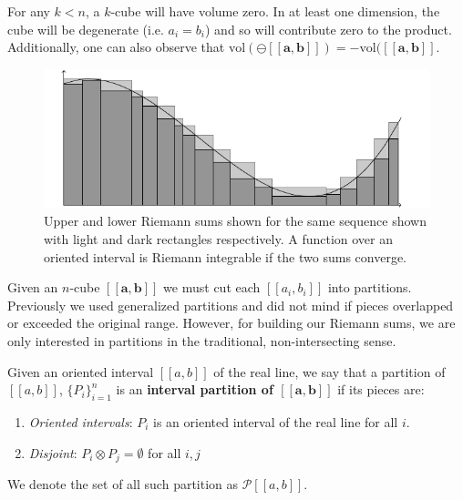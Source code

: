 For any $k<n$, a $k$-cube will have volume zero.
In at least one dimension, the cube will be degenerate (i.e. $a_i = b_i$) and so will contribute zero to the product.
Additionally, one can also observe that $\text{vol}( \ominus [\![\boldsymbol{a}, \boldsymbol{b} ]\!]) = - \text{vol}( [\![ \boldsymbol{a}, \boldsymbol{b} ]\!]$.


\begin{figure}[ht]
\caption[Riemann Integral]{Upper and lower Riemann sums shown for the same sequence shown with light and dark rectangles respectively. A function over an oriented interval is Riemann integrable if the two sums converge.}
\centering
\includegraphics[scale=0.6]{diagrams/riemann}
\end{figure}

Given an $n$-cube $[\![\boldsymbol{a}, \boldsymbol{b}]\!]$ we must cut each $[\![a_i, b_i]\!]$ into partitions.
Previously we used generalized partitions and did not mind if pieces overlapped or exceeded the original range.
However, for building our Riemann sums, we are only interested in partitions in the traditional, non-intersecting sense.

\begin{definition}
	Given an oriented interval $[\![a,b]\!]$ of the real line, we say that a partition of $[\![a,b]\!]$, $\{P_i\}_{i=1}^n$
	is an \textbf{interval partition of $\boldsymbol{[\![a,b]\!]}$} if its pieces are:
	\begin{enumerate}
		\item \emph{Oriented intervals}: $P_i$ is an oriented interval of the real line for all $i$.
		\item \emph{Disjoint}: $P_i \otimes P_j = \emptyset$ for all $i,j$
	\end{enumerate}
	We denote the set of all such partition as $\mathcal{P}[\![a,b]\!]$.
\end{definition}

